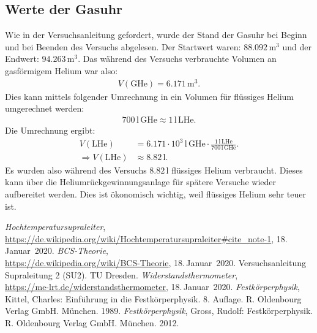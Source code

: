 \documentclass[german,  %
parskip=full,  %
]{scrartcl}
\begin{document}
\subsection{Werte der Gasuhr}
Wie in der Versuchsanleitung gefordert, wurde der Stand der Gasuhr bei Beginn und bei Beenden des Versuchs abgelesen. Der Startwert waren: $88.092 \,\text{m}^3$ und der Endwert: $94.263 \,\text{m}^3$. Das während des Versuchs verbrauchte Volumen an gasförmigem Helium war also: 
\begin{align*}
V(\text{GHe}) = 6.171 \, \text{m}^3.
\end{align*}
Dies kann mittels folgender Umrechnung in ein Volumen für flüssiges Helium umgerechnet werden:
\begin{align*}
700 \, \text{l} \, \text{GHe} \approx 1 \, \text{l} \, \text{LHe}.
\end{align*}
Die Umrechnung ergibt:
\begin{align*}
V(\text{LHe}) &= 6.171 \cdot 10^3 \, \text{l} \, \text{GHe} \cdot \frac{1 \, \text{l} \, \text{LHe}}{700 \, \text{l} \, \text{GHe}}. \\
\Rightarrow V(\text{LHe}) &\approx 8.82 \, \text{l}.
\end{align*}
Es wurden also während des Versuchs $8.82 \, \text{l}$ flüssiges Helium verbraucht. Dieses kann über die Heliumrückgewinnungsanlage für spätere Versuche wieder aufbereitet werden. Dies ist ökonomisch wichtig, weil flüssiges Helium sehr teuer ist.

\newpage
    \begin{thebibliography}{9}
    \emph{Hochtemperatursupraleiter}, \\
    \url{https://de.wikipedia.org/wiki/Hochtemperatursupraleiter#cite_note-1},
    18.\,Januar~2020.
    \emph{BCS-Theorie}, \\
    \url{https://de.wikipedia.org/wiki/BCS-Theorie},
    18.\,Januar~2020.
    Versuchsanleitung Supraleitung 2 (SU2). TU Dresden.
    \emph{Widerstandsthermometer}, \\
    \url{https://me-lrt.de/widerstandsthermometer},
    18.\,Januar~2020.
    \emph{Festkörperphysik},
    Kittel, Charles: Einführung in die Festkörperphysik. 8. Auflage. R. Oldenbourg Verlag GmbH. München. 1989.
    \emph{Festkörperphysik},
    Gross, Rudolf: Festkörperphysik. R. Oldenbourg Verlag GmbH. München. 2012.

    \end{thebibliography}

\end{document}
